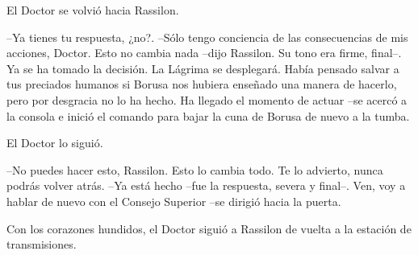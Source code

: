 El Doctor se volvió hacia Rassilon. 

--Ya tienes tu respuesta, ¿no?. 
--Sólo tengo conciencia de las consecuencias de mis acciones, Doctor. Esto no cambia nada --dijo Rassilon. Su tono era firme, final--. Ya se ha tomado la decisión. La Lágrima se desplegará. Había pensado salvar a tus preciados humanos si Borusa nos hubiera enseñado una manera de hacerlo, pero por desgracia no lo ha hecho. Ha llegado el momento de actuar --se acercó a la consola e inició el comando para bajar la cuna de Borusa de nuevo a la tumba. 

El Doctor lo siguió. 

--No puedes hacer esto, Rassilon. Esto lo cambia todo. Te lo advierto, nunca podrás volver atrás. 
--Ya está hecho --fue la respuesta, severa y final--. Ven, voy a hablar de nuevo con el Consejo Superior --se dirigió hacia la puerta.

Con los corazones hundidos, el Doctor siguió a Rassilon de vuelta a la estación de transmisiones.

